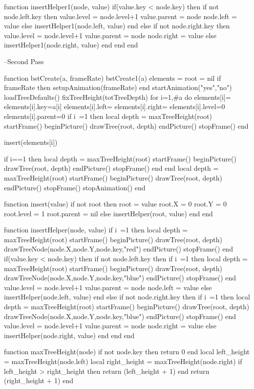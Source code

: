 function insertHelper1(node, value)	
	if(value.key < node.key) then
		if not node.left.key then
			value.level = node.level+1
			value.parent = node
			node.left = value
		else
			insertHelper1(node.left, value)
		end
	else
		if not node.right.key then
			value.level = node.level+1
			value.parent = node
			node.right = value
		else
			insertHelper1(node.right, value)
		end
	end
end


--Second Pass

function bstCreate(a, frameRate)
	bstCreate1(a)
	elements = {}
	root = nil
	if frameRate then  
		setupAnimation(frameRate)
	end
	startAnimation("yes","no")
	loadTreeDefaults()
	fixTreeHeight(totTreeDepth)
	for i=1,#a do
		elements[i]={}
		elements[i].key=a[i]
		elements[i].left={}
		elements[i].right={}
		elements[i].level=0
		elements[i].parent=0
		if i~=1 then
			local depth = maxTreeHeight(root)
			startFrame()
			beginPicture()
			drawTree(root, depth)
			endPicture()
			stopFrame()
		end

		insert(elements[i])

		if i==1 then
			local depth = maxTreeHeight(root)
			startFrame()
			beginPicture()
			drawTree(root, depth)
			endPicture()
			stopFrame()
		end
	end
	local depth = maxTreeHeight(root)
	startFrame()
	beginPicture()
	drawTree(root, depth)
	endPicture()
	stopFrame()
	stopAnimation()
end

function insert(value)
	if not root then
		root = value
		root.X = 0
		root.Y = 0
		root.level = 1
		root.parent = nil
	else
        	insertHelper(root, value)
	end
end
 
function insertHelper(node, value)	
	if i~=1 then
		local depth = maxTreeHeight(root)
		startFrame()
		beginPicture()
		drawTree(root, depth)
		drawTreeNode(node.X,node.Y,node.key,"red")
		endPicture()
		stopFrame()
	end
	if(value.key < node.key) then
		if not node.left.key then
			if i~=1 then
				local depth = maxTreeHeight(root)
				startFrame()
				beginPicture()
				drawTree(root, depth)
				drawTreeNode(node.X,node.Y,node.key,"blue")
				endPicture()
				stopFrame()
			end
			value.level = node.level+1
			value.parent = node
			node.left = value
		else
			insertHelper(node.left, value)
		end
	else
		if not node.right.key then
			if i~=1 then
				local depth = maxTreeHeight(root)
				startFrame()
				beginPicture()
				drawTree(root, depth)
				drawTreeNode(node.X,node.Y,node.key,"blue")
				endPicture()
				stopFrame()
			end
			value.level = node.level+1
			value.parent = node
			node.right = value
		else
			insertHelper(node.right, value)
		end
	end
end

function maxTreeHeight(node) 
	if not node.key then
		return 0
	end
	local left_height = maxTreeHeight(node.left)
	local right_height = maxTreeHeight(node.right)
	if left_height > right_height then 
		return (left_height + 1)
	end
	return (right_height + 1)
end
\stopluacode
